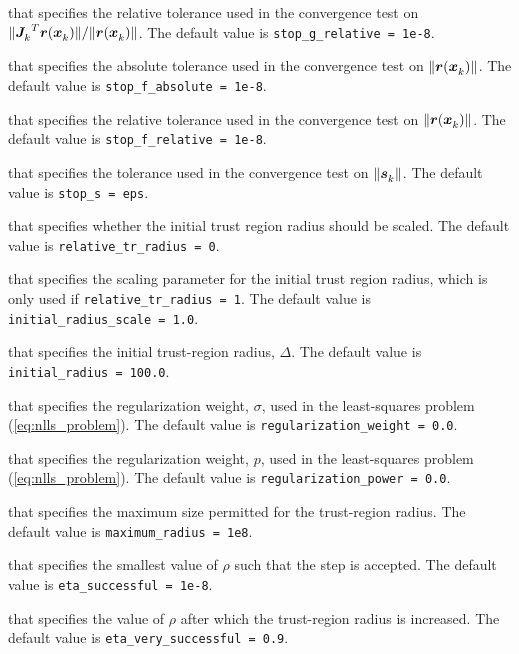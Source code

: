 \begin{description}
that specifies the relative tolerance used in the convergence test on \(\|{{\bm J}_{k}^{}}^T{\bm r}({\bm x}_{k}^{})\|/\|{\bm r}({\bm x}_{k}^{})\|\).
The default value is {\tt stop\_g\_relative = 1e{-8}}.

that specifies the absolute tolerance used in the convergence test on \(\|{\bm r}({\bm x}_{k}^{})\|\).
The default value is {\tt stop\_f\_absolute = 1e{-8}}.

that specifies the relative tolerance used in the convergence test on \(\|{\bm r}({\bm x}_{k}^{})\|\).
The default value is {\tt stop\_f\_relative = 1e{-8}}.

that specifies the tolerance used in the convergence test on \(\|{\bm s}_{k}^{}\|\).
The default value is {\tt stop\_s = eps}.

that specifies whether the initial trust region radius should be scaled.
The default value is {\tt relative\_tr\_radius = 0}.

that specifies the scaling parameter for the initial trust region radius, which is only used if {\tt relative\_tr\_radius = 1}.
The default value is {\tt initial\_radius\_scale = 1.0}.

that specifies the initial trust-region radius, $\Delta$.
The default value is {\tt initial\_radius = 100.0}.

that specifies the regularization weight, $\sigma$, used in the least-squares problem (\ref{eq:nlls_problem}).
The default value is {\tt regularization\_weight = 0.0}.

that specifies the regularization weight, $p$, used in the least-squares problem (\ref{eq:nlls_problem}).
The default value is {\tt regularization\_power = 0.0}.


that specifies the maximum size permitted for the trust-region radius.
The default value is {\tt maximum\_radius = 1e8}.

that specifies the smallest value of $\rho$ such that the step is accepted.
The default value is {\tt eta\_successful = 1e-8}.


that specifies the value of $\rho$ after which the trust-region radius is increased.
The default value is {\tt eta\_very\_successful = 0.9}.


\end{description}
